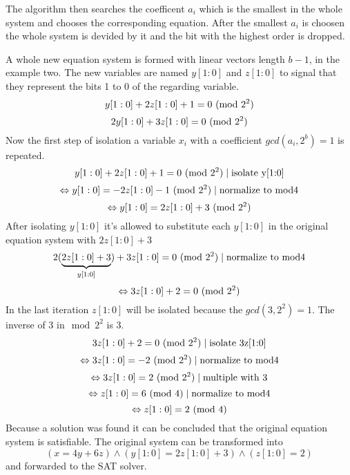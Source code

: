 The algorithm then searches the coefficent $a_i$ which is the smallest in the whole system and chooses the corresponding equation.
After the smallest $a_i$ is choosen the whole system is devided by it and the bit with the highest order is dropped.

A whole new equation system is formed with linear vectors length $b-1$, in the example two.
The new variables are named $y[1:0]$ and $z[1:0]$ to signal that they represent the bits 1 to 0 of the regarding variable.
$$y[1 : 0] + 2z[1 : 0] + 1 = 0 \ (\mathrm{mod}\ 2^2)$$
$$2y[1 : 0] + 3z[1 : 0] = 0\ (\mathrm{mod}\ 2^2)$$
Now the first step of isolation a variable $x_i$ with a coefficient $gcd(a_i, 2^b)=1$ is repeated.
$$y[1 : 0] + 2z[1 : 0] + 1 = 0 \ (\mathrm{mod}\ 2^2)\mid \text{isolate y[1:0]}$$
$$\Leftrightarrow y[1 : 0] = -2z[1 : 0] -1 \ (\mathrm{mod}\ 2^2) \mid \text{normalize to mod4}$$
$$\Leftrightarrow y[1 : 0] = 2z[1 : 0] +3 \ (\mathrm{mod}\ 2^2)$$
After isolating $y[1 : 0] $ it's allowed to substitute each $y[1 : 0] $ in the original equation system with $2z[1:0]+3$
$$2(\underbrace{2z[1:0]+3}_{y[1:0]}) + 3z[1 : 0] = 0\ (\mathrm{mod}\ 2^2) \mid \text{normalize to mod4}$$
$$\Leftrightarrow 3z[1:0] + 2 = 0 \ (\mathrm{mod}\ 2^2)$$
In the last iteration $z[1:0]$ will be isolated because the $gcd(3,2^2) = 1$. The inverse of 3 in$\mod{2^2}$ is 3.
$$3z[1:0] + 2 = 0 \ (\mathrm{mod}\ 2^2) \mid \text{isolate 3z[1:0]}$$
$$\Leftrightarrow 3z[1:0]=-2  \ (\mathrm{mod}\ 2^2)   \mid \text{normalize to mod4}$$
$$\Leftrightarrow 3z[1:0]=2  \ (\mathrm{mod}\ 2^2)   \mid \text{multiple with 3}$$
$$\Leftrightarrow z[1:0]=6  \ (\mathrm{mod}\ 4)  \mid \text{normalize to mod4}$$
$$\Leftrightarrow z[1:0]=2  \ (\mathrm{mod}\ 4)$$
Because a solution was found it can be concluded that the original equation system is satisfiable.
The original system can be transformed into $$(x = 4y + 6z) \land (y[1 : 0] = 2z[1 : 0] + 3) \land (z[1 : 0] = 2)$$ and forwarded to the SAT solver.
